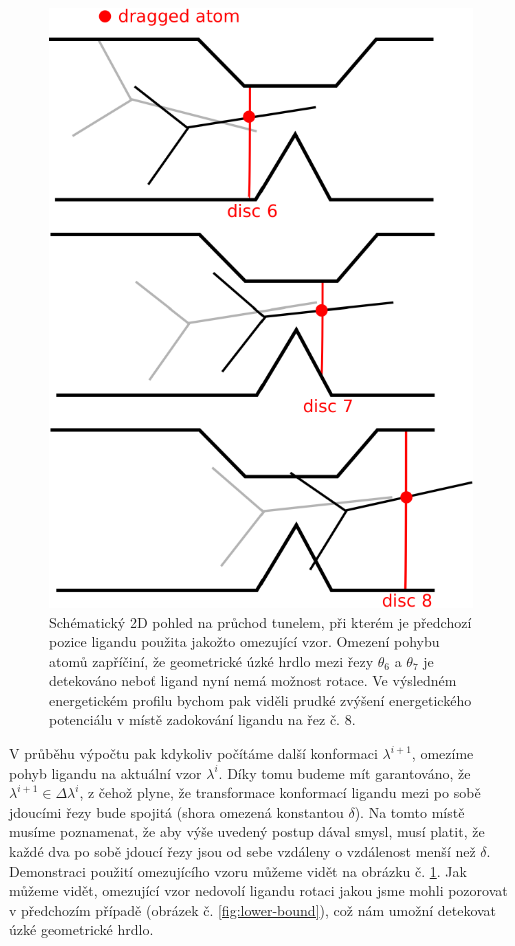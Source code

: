 \begin{figure}[t]
\centering
\includegraphics[width=.5\hsize]{img/tun-2.pdf}
\caption{Schématický 2D pohled na průchod tunelem, při kterém je předchozí pozice
ligandu použita jakožto omezující vzor. Omezení pohybu atomů zapříčiní, že geometrické
úzké hrdlo mezi řezy $\theta_6$ a $\theta_7$ je detekováno neboť ligand nyní
nemá možnost rotace. Ve výsledném energetickém profilu bychom pak viděli prudké
zvýšení energetického potenciálu v místě zadokování ligandu na řez č. 8.}
\label{fig:continuous_transition}
\end{figure}

V průběhu výpočtu pak kdykoliv počítáme další konformaci $ \lambda^{i+1} $,
omezíme pohyb ligandu na aktuální vzor $ \lambda^{i} $. Díky tomu budeme mít
garantováno, že $ \lambda^{i+1} \in \Delta \lambda^i $, z čehož plyne, že
transformace konformací ligandu mezi po sobě jdoucími řezy bude spojitá
(shora omezená konstantou $ \delta $). Na tomto místě musíme poznamenat, že aby
výše uvedený postup dával smysl, musí platit, že každé dva po sobě jdoucí řezy jsou
od sebe vzdáleny o vzdálenost menší než $ \delta $. Demonstraci použití
omezujícího vzoru můžeme vidět na obrázku č. \ref{fig:continuous_transition}. Jak
můžeme vidět, omezující vzor nedovolí ligandu rotaci jakou jsme mohli pozorovat
v předchozím případě (obrázek č. \ref{fig:lower-bound}), což nám umožní detekovat
úzké geometrické hrdlo.






